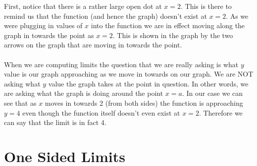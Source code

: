 \documentclass[10pt,reqno]{book}
\begin{document}
	\begin{center}
	\end{center}
	First, notice that there is a rather large open dot at $ x=2 $. This is there to remind us that the function (and hence the graph) doesn't exist at $ x=2 $. As we were plugging in values of $ x $ into the function we are in effect moving along the graph in towards the point as $ x=2 $. This is shown in the graph by the two arrows on the graph that are moving in towards the point.\\ \\
	When we are computing limits the question that we are really asking is what $ y $ value is our graph approaching as we move in towards  on our graph. We are NOT asking what $ y $ value the graph takes at the point in question. In other words, we are asking what the graph is doing around the point $ x=a $. In our case we can see that as $ x $ moves in towards 2 (from both sides) the function is approaching $ y=4 $ even though the function itself doesn't even exist at $ x=2 $. Therefore we can say that the limit is in fact 4.
	
	\section{One Sided Limits}
	
\end{document}
